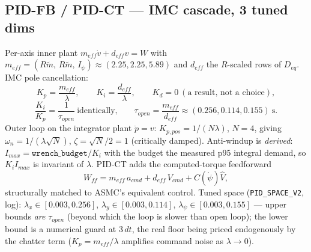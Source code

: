 \documentclass[11pt]{article}
\begin{document}
\subsection{PID-FB / PID-CT --- IMC cascade, 3 tuned dims}
Per-axis inner plant $m_{eff}\dot v + d_{eff} v = W$ with
$m_{eff}=(R\tilde m,\,R\tilde m,\,I_\psi)\approx(2.25,2.25,5.89)$ and $d_{eff}$ the
$R$-scaled rows of $D_{eq}$. IMC pole cancellation:
\begin{equation}
K_p=\frac{m_{eff}}{\lambda},\qquad K_i=\frac{d_{eff}}{\lambda},\qquad K_d=0\ (\text{a
result, not a choice}),
\end{equation}
\begin{equation}
\frac{K_i}{K_p}=\frac{1}{\tau_{open}}\ \text{identically,}\qquad
\tau_{open}=\frac{m_{eff}}{d_{eff}}\approx(0.256,0.114,0.155)\ \mathrm{s}.
\end{equation}
Outer loop on the integrator plant $\dot p = v$: $K_{p,pos}=1/(N\lambda)$, $N=4$, giving
$\omega_n=1/(\lambda\sqrt N)$, $\zeta=\sqrt N/2=1$ (critically damped). Anti-windup is
\emph{derived}: $I_{max}=\texttt{wrench\_budget}/K_i$ with the budget the measured p95
integral demand, so $K_iI_{max}$ is invariant of $\lambda$. PID-CT adds the
computed-torque feedforward
\begin{equation}
W_{ff}=m_{eff}\,a_{cmd}+d_{eff}\,V_{cmd}+C(\dot\psi)\hat V ,
\end{equation}
structurally matched to ASMC's equivalent control. Tuned space
(\texttt{PID\_SPACE\_V2}, log): $\lambda_x\in[0.003,0.256]$,
$\lambda_y\in[0.003,0.114]$, $\lambda_\psi\in[0.003,0.155]$ --- upper bounds
\emph{are} $\tau_{open}$ (beyond which the loop is slower than open loop); the lower
bound is a numerical guard at $3\,dt$, the real floor being priced endogenously by the
chatter term ($K_p=m_{eff}/\lambda$ amplifies command noise as $\lambda\to0$).
\end{document}
